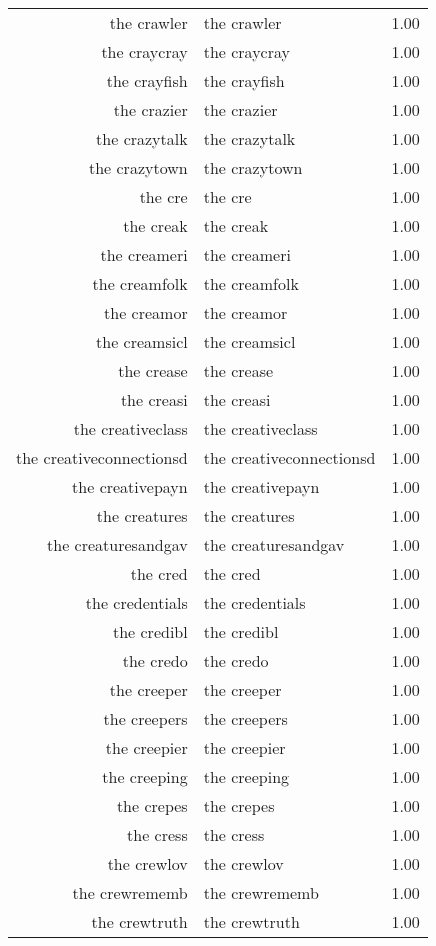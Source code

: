 \begin{table}[ht]
\begin{tabular}{rlr}
  the crawler & the crawler & 1.00 \\ 
  the craycray & the craycray & 1.00 \\ 
  the crayfish & the crayfish & 1.00 \\ 
  the crazier & the crazier & 1.00 \\ 
  the crazytalk & the crazytalk & 1.00 \\ 
  the crazytown & the crazytown & 1.00 \\ 
  the cre & the cre & 1.00 \\ 
  the creak & the creak & 1.00 \\ 
  the creameri & the creameri & 1.00 \\ 
  the creamfolk & the creamfolk & 1.00 \\ 
  the creamor & the creamor & 1.00 \\ 
  the creamsicl & the creamsicl & 1.00 \\ 
  the crease & the crease & 1.00 \\ 
  the creasi & the creasi & 1.00 \\ 
  the creativeclass & the creativeclass & 1.00 \\ 
  the creativeconnectionsd & the creativeconnectionsd & 1.00 \\ 
  the creativepayn & the creativepayn & 1.00 \\ 
  the creatures & the creatures & 1.00 \\ 
  the creaturesandgav & the creaturesandgav & 1.00 \\ 
  the cred & the cred & 1.00 \\ 
  the credentials & the credentials & 1.00 \\ 
  the credibl & the credibl & 1.00 \\ 
  the credo & the credo & 1.00 \\ 
  the creeper & the creeper & 1.00 \\ 
  the creepers & the creepers & 1.00 \\ 
  the creepier & the creepier & 1.00 \\ 
  the creeping & the creeping & 1.00 \\ 
  the crepes & the crepes & 1.00 \\ 
  the cress & the cress & 1.00 \\ 
  the crewlov & the crewlov & 1.00 \\ 
  the crewrememb & the crewrememb & 1.00 \\ 
  the crewtruth & the crewtruth & 1.00 \\ 

\end{tabular}
\end{table}
